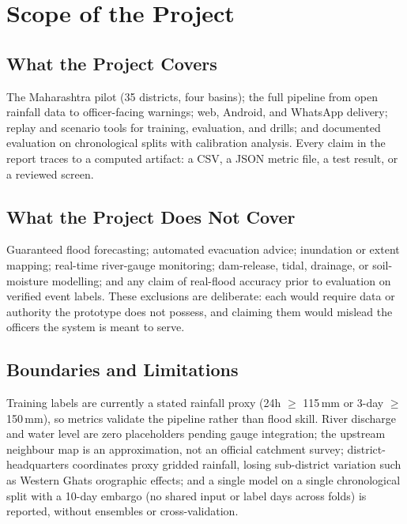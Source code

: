 \documentclass[a4paper,12pt]{report}
\begin{document}
\chapter{Scope of the Project}
\section{What the Project Covers}
The Maharashtra pilot (35 districts, four basins); the full pipeline from open rainfall data to officer-facing warnings; web, Android, and WhatsApp delivery; replay and scenario tools for training, evaluation, and drills; and documented evaluation on chronological splits with calibration analysis. Every claim in the report traces to a computed artifact: a CSV, a JSON metric file, a test result, or a reviewed screen.

\section{What the Project Does Not Cover}
Guaranteed flood forecasting; automated evacuation advice; inundation or extent mapping; real-time river-gauge monitoring; dam-release, tidal, drainage, or soil-moisture modelling; and any claim of real-flood accuracy prior to evaluation on verified event labels. These exclusions are deliberate: each would require data or authority the prototype does not possess, and claiming them would mislead the officers the system is meant to serve.

\section{Boundaries and Limitations}
Training labels are currently a stated rainfall proxy (24h $\geq$ 115\,mm or 3-day $\geq$ 150\,mm), so metrics validate the pipeline rather than flood skill. River discharge and water level are zero placeholders pending gauge integration; the upstream neighbour map is an approximation, not an official catchment survey; district-headquarters coordinates proxy gridded rainfall, losing sub-district variation such as Western Ghats orographic effects; and a single model on a single chronological split with a 10-day embargo (no shared input or label days across folds) is reported, without ensembles or cross-validation.
\end{document}
